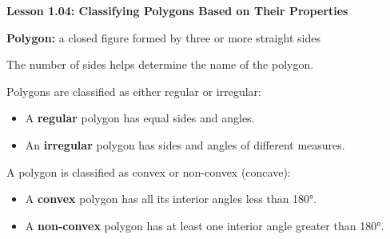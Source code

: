 \begin{center}
\textbf{Lesson 1.04: Classifying Polygons Based on Their Properties}
\end{center}

\vspace*{-1.5ex}

\noindent\textbf{Polygon:} a closed figure formed by three or more straight sides

\noindent  The number of sides helps determine the name of the polygon.

\noindent Polygons are classified as either regular or irregular:
        \begin{itemize}
            \item A \textbf{regular} polygon has equal sides and angles.
            \item An \textbf{irregular} polygon has sides and angles of different measures.
        \end{itemize}

\noindent A polygon is classified as convex or non-convex (concave):
        \begin{itemize}
            \item A \textbf{convex} polygon has all its interior angles less than 180°.
            \item A \textbf{non-convex} polygon has at least one interior angle greater than 180°.
        \end{itemize}
